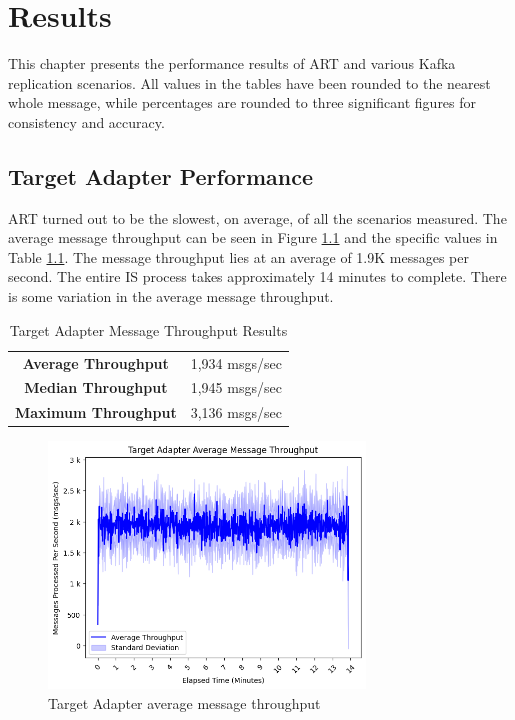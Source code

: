 \chapter{Results}
\label{ch06:results}
This chapter presents the performance results of \ac{ART} and various Kafka replication scenarios. All values in the tables have been rounded to the nearest whole message, while percentages are rounded to three significant figures for consistency and accuracy.

\section{Target Adapter Performance}
\label{ch06:results:artperformance}
\ac{ART} turned out to be the slowest, on average, of all the scenarios measured. The average message throughput can be seen in Figure \ref{fig:chapter06:results:artavgmessage} and the specific values in Table \ref{tab:art:messagethroughput}. The message throughput lies at an average of 1.9K messages per second. The entire \ac{IS} process takes approximately 14 minutes to complete. There is some variation in the average message throughput.

\begin{table}
    \centering
    \begin{tabular}{|cc|}
        \hline
         \textbf{Average Throughput} & 1,934 msgs/sec \\
         \textbf{Median Throughput} & 1,945 msgs/sec \\
         \textbf{Maximum Throughput} & 3,136 msgs/sec \\
        \hline
    \end{tabular}
    \caption{Target Adapter Message Throughput Results}
    \label{tab:art:messagethroughput}
\end{table}

\begin{figure}[htbp]
    \centering
    \includegraphics[width=0.75\textwidth]{chapters/images/art-performance/art-avg-message-throughput.png}
    \caption{Target Adapter average message throughput}
    \label{fig:chapter06:results:artavgmessage}
\end{figure}

